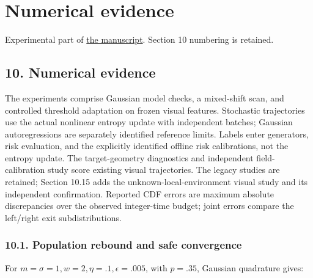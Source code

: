 \section{Numerical evidence}\label{experiments-numerical-evidence}

Experimental part of \href{DRAFT.md}{the manuscript}. Section 10
numbering is retained.

\subsection{10. Numerical evidence}\label{experiments-numerical-evidence-1}

The experiments comprise Gaussian model checks, a mixed-shift scan, and
controlled threshold adaptation on frozen visual features. Stochastic
trajectories use the actual nonlinear entropy update with independent
batches; Gaussian autoregressions are separately identified reference
limits. Labels enter generators, risk evaluation, and the explicitly
identified offline risk calibrations, not the entropy update. The
target-geometry diagnostics and independent field-calibration study
score existing visual trajectories. The legacy studies are retained; Section 10.15 adds the unknown-local-environment visual study and its independent confirmation.
Reported CDF errors are maximum absolute discrepancies over the observed
integer-time budget; joint errors compare the left/right exit
subdistributions.

\subsubsection{10.1. Population rebound and safe
convergence}\label{experiments-population-rebound-and-safe-convergence}

For \(m=\sigma=1,w=2,\eta=.1,\epsilon=.005\), with \(p=.35\), Gaussian
quadrature gives:

